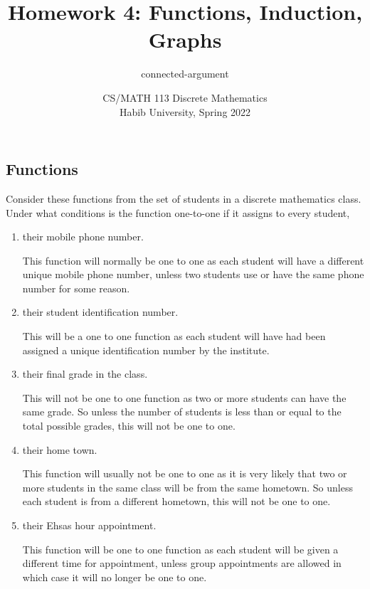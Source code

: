 \documentclass[addpoints]{exam}
\title{Homework 4: Functions, Induction, Graphs}
\author{connected-argument}  %
\date{CS/MATH 113 Discrete Mathematics\\Habib University, Spring 2022}
\begin{document}
\maketitle

\begin{questions}

  \section*{Functions}
  
\question[5] Consider these functions from the set of students in a discrete mathematics class. Under what conditions is the
  function one-to-one if it assigns to every student,
  
  \begin{enumerate}[label=\alph*)]
  \item their mobile phone number.
    \begin{solution}
      This function will normally be one to one as each student will have a different unique mobile phone number, unless 
      two students use or have the same phone number for some reason.
    \end{solution}
  \item their student identification number.
    \begin{solution}
      This will be a one to one function as each student will have had been assigned a unique identification number by the institute.
    \end{solution}
  \item their final grade in the class.
    \begin{solution}
      This will not be one to one function as two or more students can have the same grade. So unless the number of students is less 
      than or equal to the total possible grades, this will not be one to one.
    \end{solution}
  \item their home town.
    \begin{solution}
      This function will usually not be one to one as it is very likely that two or more students in the same class will be from 
      the same hometown. So unless each student is from a different hometown, this will not be one to one.
    \end{solution}
  \item their Ehsas hour appointment.
    \begin{solution}
      This function will be one to one function as each student will be given a different time for appointment, unless group 
      appointments are allowed in which case it will no longer be one to one.
    \end{solution}
  \end{enumerate}



\end{questions}
\end{document}
